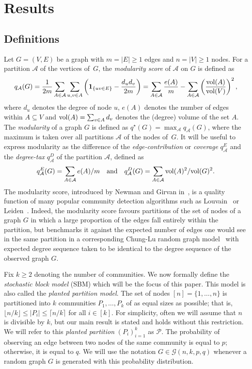 \documentclass[a4paper,UKenglish,cleveref, autoref, thm-restate,numberwithinsect]{lipics-v2021}
\newcommand{\cA}{\mathcal{A}}
\newcommand{\cP}{\mathcal{P}}
\newcommand{\q}{q^{\star}}
\newcommand{\vol}{{\rm vol}}
\begin{document}
\section{Results}

\subsection{Definitions}

Let $G = (V,E)$ be a graph with $m = |E| \geq 1$ edges and $n = |V| \ge 1$ nodes. For a partition $\cA$ of the vertices of~$G$, the \emph{modularity score} of $\cA$ on $G$ is defined as
\begin{eqnarray}
q_\cA(G) = 
\frac{1}{2m}\sum_{A\in \cA} \sum_{u,v \in A}  
\left( {\mathbf 1}_{\{uv\in E\}} - \frac{d_u d_v}{2m} \right) 
= \sum_{A \in \cA} \frac{e(A)}{m} - \sum_{A\in \cA} \left( \frac {\vol (A)}{\vol(V)} \right)^2, \label{def.mod} 
\end{eqnarray}
where $d_u$ denotes the degree of node $u$, $e(A)$ denotes the number of edges within $A\subseteq V$ and $\vol(A) = \sum_{v \in A} d_v$ denotes the (degree) volume of the set $A$. The \emph{modularity} of a graph $G$ is  defined as $\q(G)=\max_\cA q_{\cA}(G)$, where the maximum is taken over all partitions $\cA$ of the nodes of~$G$. It will be useful to express modularity as the difference of the \emph{edge-contribution} or \emph{coverage} $q^E_\cA$ and the \emph{degree-tax} $q^D_\cA$ of the partition $\cA$, defined as
\begin{equation}\label{def.qEandqD} q^E_\cA(G)=\sum_{A\in\cA}e(A)/m \quad \mbox{and} \quad q^D_\cA(G)=\sum_{A\in\cA}\vol(A)^2/\vol(G)^2.\end{equation}
%
The modularity score, introduced by Newman and Girvan in~\cite{NewmanGirvan}, is a quality function of many popular community detection algorithms such as Louvain~\cite{blondel2008fast} or Leiden~\cite{traag2019louvain}. Indeed, the modularity score favours partitions of the set of nodes of a graph $G$ in which a large proportion of the edges fall entirely within the partition, but benchmarks it against the expected number of edges one would see in the same partition in a corresponding Chung-Lu random graph model~\cite{chung2006complex} with expected degree sequence taken to be identical to the degree sequence of the observed graph $G$. 

Fix $k\geq 2$ denoting the number of communities. We now formally define the  \emph{stochastic block model} (SBM) which will be the focus of this paper. This model is also called the \emph{planted partition model}. The set of nodes $[n]=\{1, \ldots, n\}$ is partitioned into $k$ communities $P_1, \ldots, P_k$ of as equal sizes as possible; that is, $\lfloor n/k \rfloor \le |P_i| \le \lceil n/k \rceil$ for all $i \in [k]$. For simplicity, often we will assume that $n$ is divisible by $k$, but our main result is stated and holds without this restriction. We will refer to this \emph{planted partition} $(P_i)_{i=1}^k$ as $\cP$. The probability of observing an edge between two nodes of the same community is equal to $p$; otherwise, it is equal to $q$. We will use the notation $G \in \mathcal{G}(n,k,p,q)$ whenever a random graph $G$ is generated with this probability distribution. 
\end{document}
